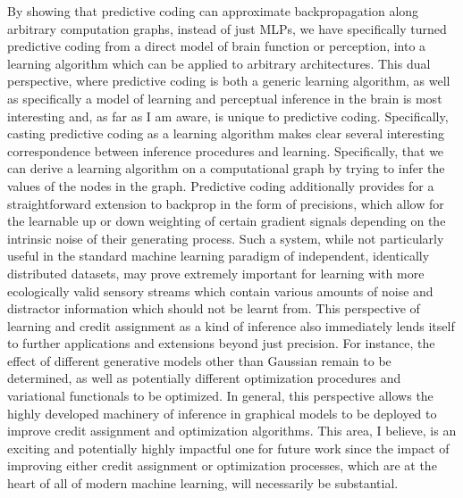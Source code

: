 By showing that predictive coding can approximate backpropagation along arbitrary computation graphs, instead of just MLPs, we have specifically turned predictive coding from a direct model of brain function or perception, into a learning algorithm which can be applied to arbitrary architectures. This dual perspective, where predictive coding is both a generic learning algorithm, as well as specifically a model of learning and perceptual inference in the brain is most interesting and, as far as I am aware, is unique to predictive coding. Specifically, casting predictive coding as a learning algorithm makes clear several interesting correspondence between inference procedures and learning. Specifically, that we can derive a learning algorithm on a computational graph by trying to infer the values of the nodes in the graph. Predictive coding additionally provides for a straightforward extension to backprop in the form of precisions, which allow for the learnable up or down weighting of certain gradient signals depending on the intrinsic noise of their generating process. Such a system, while not particularly useful in the standard machine learning paradigm of independent, identically distributed datasets, may prove extremely important for learning with more ecologically valid sensory streams which contain various amounts of noise and distractor information which should not be learnt from. This perspective of learning and credit assignment as a kind of inference also immediately lends itself to further applications and extensions beyond just precision. For instance, the effect of different generative models other than Gaussian remain to be determined, as well as potentially different optimization procedures and variational functionals to be optimized. In general, this perspective allows the highly developed machinery of inference in graphical models \citep{pearl2014probabilistic,ghahramani2001propagation,beal2003variational,yedidia2011message} to be deployed to improve credit assignment and optimization algorithms. This area, I believe, is an exciting and potentially highly impactful one for future work since the impact of improving either credit assignment or optimization processes, which are at the heart of all of modern machine learning, will necessarily be substantial.

